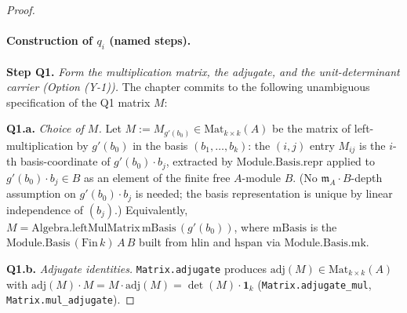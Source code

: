 \begin{proof}
\paragraph{Construction of $q_i$ (named steps).}

\textbf{Step Q1.} \emph{Form the multiplication matrix, the
adjugate, and the unit-determinant carrier (Option (Y-1)).}
The chapter commits to the following unambiguous specification
of the Q1 matrix $M$:

\textbf{Q1.a.} \emph{Choice of $M$.}
Let $M := M_{g'(b_0)} \in \mathrm{Mat}_{k \times k}(A)$ be the
matrix of left-multiplication by $g'(b_0)$ in the basis
$(b_1, \ldots, b_k)$: the $(i, j)$ entry $M_{ij}$ is the
$i$-th basis-coordinate of $g'(b_0) \cdot b_j$, extracted by
$\mathrm{Module.Basis.repr}$ applied to
$g'(b_0) \cdot b_j \in B$ as an element of the finite free
$A$-module $B$. (No $\mathfrak m_A \cdot B$-depth assumption on
$g'(b_0) \cdot b_j$ is needed; the basis representation is
unique by linear independence of $(b_j)$.) Equivalently,
$M = \mathrm{Algebra.leftMulMatrix}\,\mathrm{mBasis}\,(g'(b_0))$,
where $\mathrm{mBasis}$ is the
$\mathrm{Module.Basis}\,(\mathrm{Fin}\,k)\,A\,B$ built from
$\mathrm{hlin}$ and $\mathrm{hspan}$ via
$\mathrm{Module.Basis.mk}$.

\textbf{Q1.b.} \emph{Adjugate identities.}
\texttt{Matrix.adjugate} produces $\mathrm{adj}(M) \in
\mathrm{Mat}_{k\times k}(A)$ with $\mathrm{adj}(M) \cdot M =
M \cdot \mathrm{adj}(M) = \det(M) \cdot \mathbf{1}_k$
(\texttt{Matrix.adjugate\_mul},
\texttt{Matrix.mul\_adjugate}).


\end{proof}

